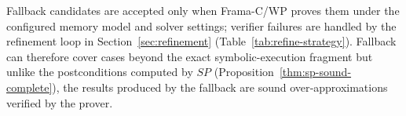 \DIFaddbegin
Fallback candidates are accepted only when Frama-C/WP proves them under the configured memory model and solver settings; verifier failures are handled by the refinement loop in Section~\ref{sec:refinement} (Table~\ref{tab:refine-strategy}). Fallback can therefore cover cases beyond the exact symbolic-execution fragment but 
unlike the postconditions computed by \(\textit{SP}\) (Proposition~\ref{thm:sp-sound-complete}), the results produced by the fallback are sound over‑approximations verified by the prover.
\DIFaddend

